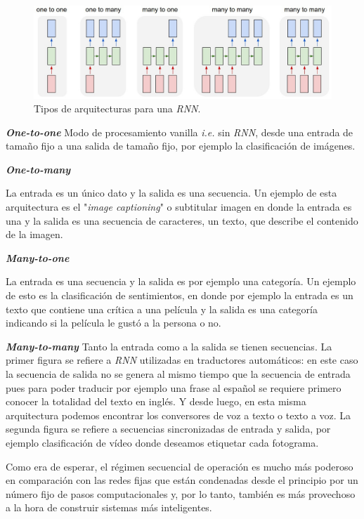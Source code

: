 \documentclass[a4paper,12pt]{article}
\begin{document}
\begin{figure}[H]
	\begin{center}				
	\includegraphics[width=1\textwidth]{rnnarch.jpg}
  	\caption{Tipos de arquitecturas para una \textit{RNN}.}
  	\label{fig:rnnarch}
  	\end{center}
\end{figure}

\textbf{\textit{One-to-one}}
Modo de procesamiento vanilla \textit{i.e.} sin \textit{RNN}, desde una entrada de tamaño fijo a una salida de tamaño fijo, por ejemplo la clasificación de imágenes.

\textbf{\textit{One-to-many}}

La entrada es un único dato y la salida es una secuencia. Un ejemplo de esta arquitectura es el "\textit{image captioning}" o subtitular imagen en donde la entrada es una y la salida es una secuencia de caracteres, un texto, que describe el contenido de la imagen.

\textbf{\textit{Many-to-one}}

La entrada es una secuencia y la salida es por ejemplo una categoría. Un ejemplo de esto es la clasificación de sentimientos, en donde por ejemplo la entrada es un texto que contiene una crítica a una película y la salida es una categoría indicando si la película le gustó a la persona o no.

\textbf{\textit{Many-to-many}}
Tanto la entrada como a la salida se tienen secuencias. La primer figura se refiere a \textit{RNN} utilizadas en traductores automáticos: en este caso la secuencia de salida no se genera al mismo tiempo que la secuencia de entrada pues para poder traducir por ejemplo una frase al español se requiere primero conocer la totalidad del texto en inglés. Y desde luego, en esta misma arquitectura podemos encontrar los conversores de voz a texto o texto a voz.
La segunda figura se refiere a secuencias sincronizadas de entrada y salida, por ejemplo clasificación de vídeo donde deseamos etiquetar cada fotograma.

Como era de esperar, el régimen secuencial de operación es mucho más poderoso en comparación con las redes fijas que están condenadas desde el principio por un número fijo de pasos computacionales y, por lo tanto, también es más provechoso a la hora de construir sistemas más inteligentes. 
\end{document}
